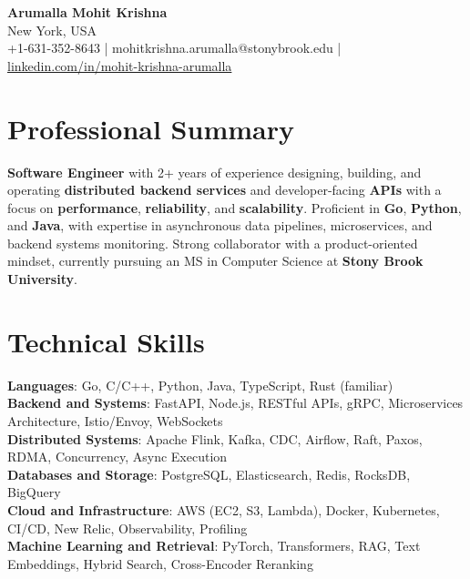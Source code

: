 \documentclass[letterpaper,11pt]{article}
\begin{document}
\begin{center}
  {\Large \textbf{Arumalla Mohit Krishna}} \\
  New York, USA \\
  +1-631-352-8643 \enspace | \enspace mohitkrishna.arumalla@stonybrook.edu \enspace | \enspace \href{https://www.linkedin.com/in/mohit-krishna-arumalla}{linkedin.com/in/mohit-krishna-arumalla}
\end{center}

\section{Professional Summary}
  \begin{itemize}[leftmargin=0.15in, label={}]
    \small{\item{
     \textbf{Software Engineer} with 2+ years of experience designing, building, and operating \textbf{distributed backend services} and developer-facing \textbf{APIs} with a focus on \textbf{performance}, \textbf{reliability}, and \textbf{scalability}. Proficient in \textbf{Go}, \textbf{Python}, and \textbf{Java}, with expertise in asynchronous data pipelines, microservices, and backend systems monitoring. Strong collaborator with a product-oriented mindset, currently pursuing an MS in Computer Science at \textbf{Stony Brook University}.
    }}
  \end{itemize}
\vspace{-16pt}

\section{Technical Skills}
 \begin{itemize}[leftmargin=0.15in, label={}]
    \small{\item{
     \textbf{Languages}: Go, C/C++, Python, Java, TypeScript, Rust (familiar) \\
     \textbf{Backend and Systems}: FastAPI, Node.js, RESTful APIs, gRPC, Microservices Architecture, Istio/Envoy, WebSockets \\
     \textbf{Distributed Systems}: Apache Flink, Kafka, CDC, Airflow, Raft, Paxos, RDMA, Concurrency, Async Execution \\
     \textbf{Databases and Storage}: PostgreSQL, Elasticsearch, Redis, RocksDB, BigQuery \\
     \textbf{Cloud and Infrastructure}: AWS (EC2, S3, Lambda), Docker, Kubernetes, CI/CD, New Relic, Observability, Profiling \\
     \textbf{Machine Learning and Retrieval}: PyTorch, Transformers, RAG, Text Embeddings, Hybrid Search, Cross-Encoder Reranking
    }}
 \end{itemize}
\vspace{-16pt}
\end{document}
